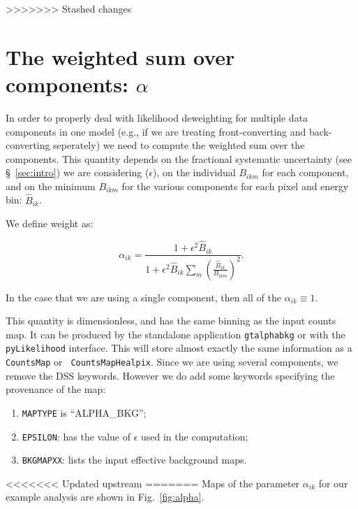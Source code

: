 \documentclass[preprint]{aastex}
\begin{document}
>>>>>>> Stashed changes
\section{The weighted sum over components: \texorpdfstring{$\alpha$}{alpha}}

In order to properly deal with likelihood deweighting for multiple 
data components in one model (e.g., if we are treating 
front-converting and back-converting seperately) we need to
compute the weighted sum over the components.  This quantity depends on
the fractional systematic uncertainty (see \S~\ref{sec:intro})
we are considering ($\epsilon$), on the individual $B_{ikm}$ for each component, and on the
minimum $B_{ikm}$ for the various components for each pixel and energy
bin: $\hat{B}_{ik}$.

We define weight as:

\begin{equation}
\alpha_{ik} = \frac{1 + \epsilon^2 \hat{B}_{ik}}{1 + \epsilon^2 \hat{B}_{ik} \sum_{m} (\frac{\hat{B}_{ik}}{B_{ikm}})^2 }.
\end{equation}

\noindent In the case that we are using a single component, then all
of the $\alpha_{ik} \equiv 1$.

This quantity is dimensionless, and has the same binning as the input
counts map.  It can be produced by the standalone application {\tt gtalphabkg}
or with the {\tt pyLikelihood} interface.  This will store almost
exactly the same information as a {\tt CountsMap} or {\tt
  CountsMapHealpix}. Since we are using several components, we remove 
the DSS keywords.  However we do add some keywords specifying the
provenance of the map:

\begin{enumerate}
\item{{\tt MAPTYPE} is ``ALPHA\_BKG'';}
\item{{\tt EPSILON}: has the value of $\epsilon$ used in the computation;}
\item{{\tt BKGMAPXX}: lists the input effective background maps.}    
\end{enumerate}

<<<<<<< Updated upstream
=======
Maps of the parameter $\alpha_{ik}$ for our example analysis are shown in Fig.~\ref{fig:alpha}.
\end{document}
